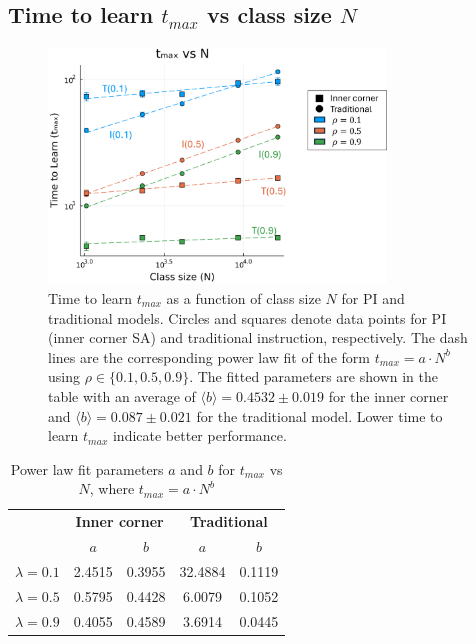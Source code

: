 \newpage

\subsection{Time to learn $t_{max}$ vs class size $N$} \label{subsec: 2DBPCA tmax vs N}
\begin{figure}[h!]
    \centering
    \includegraphics[width=0.8\textwidth]{figures/2D-BPCA-analysis/N_vs_tmax-traditional-inner_corner.png}
    \caption[Class size $N$ dependence of time to learn $t_{max}$ in homogenous classroom models]{Time to learn $t_{max}$ as a function of class size $N$ for PI and traditional models. 
    Circles and squares denote data points for PI (inner corner SA) and traditional instruction, respectively. 
    The dash lines are the corresponding power law fit of the form $t_{max}=a \cdot N^b$ using $\rho \in \lbrace 0.1, 0.5, 0.9 \rbrace$. 
    The fitted parameters are shown in the table with an average of $\langle b \rangle = 0.4532 \pm 0.019$ for the inner corner and $\langle b \rangle = 0.087\pm0.021$ for the traditional model.
    Lower time to learn $t_{max}$ indicate better performance.
    }
    \label{fig:Traditional vs PI tmax vs N}
\end{figure}

\begin{table}[htbp!]
  \centering
  
  \begin{tabular}{|c|cc|cc|}
    \hline
    & \multicolumn{2}{c|}{\textbf{Inner corner}}       & \multicolumn{2}{c|}{\textbf{Traditional}}        \\ \cline{2-5} 
    & \multicolumn{1}{c|}{\textbf{$a$}} & \textbf{$b$} & \multicolumn{1}{c|}{\textbf{$a$}} & \textbf{$b$} \\ \hline
    \textbf{$\lambda=0.1$} & \multicolumn{1}{c|}{2.4515}       & 0.3955       & \multicolumn{1}{c|}{32.4884}      & 0.1119       \\ \hline
    \textbf{$\lambda=0.5$} & \multicolumn{1}{c|}{0.5795}       & 0.4428       & \multicolumn{1}{c|}{6.0079}       & 0.1052       \\ \hline
    \textbf{$\lambda=0.9$} & \multicolumn{1}{c|}{0.4055}       & 0.4589       & \multicolumn{1}{c|}{3.6914}       & 0.0445       \\ \hline
  \end{tabular}
  \caption{Power law fit parameters $a$ and $b$ for $t_{max}$ vs $N$, where $t_{max}=a \cdot N ^ b$}
  \label{tab:2DBPCA tmax vs N fit params}
\end{table}

